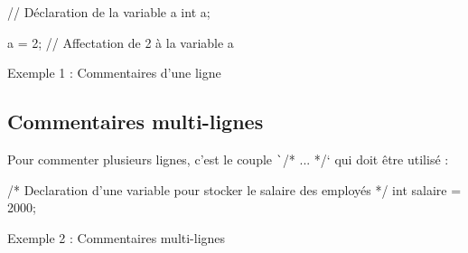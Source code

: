 \documentclass[10pt]{article}
\begin{document}
\begin{cppcode}
    // Déclaration de la variable a
    int a;

    a = 2; // Affectation de 2 à la variable a
\end{cppcode}
\caption{Exemple 1 : Commentaires d'une ligne}

\subsection{Commentaires multi-lignes}
Pour commenter plusieurs lignes, c'est le couple \texttt`/* ... */` qui doit être utilisé :

\begin{cppcode}
    /* Declaration d'une variable
    pour stocker le salaire des employés
    */
    int salaire = 2000;
\end{cppcode}
\caption{Exemple 2 : Commentaires multi-lignes}
\end{document}

